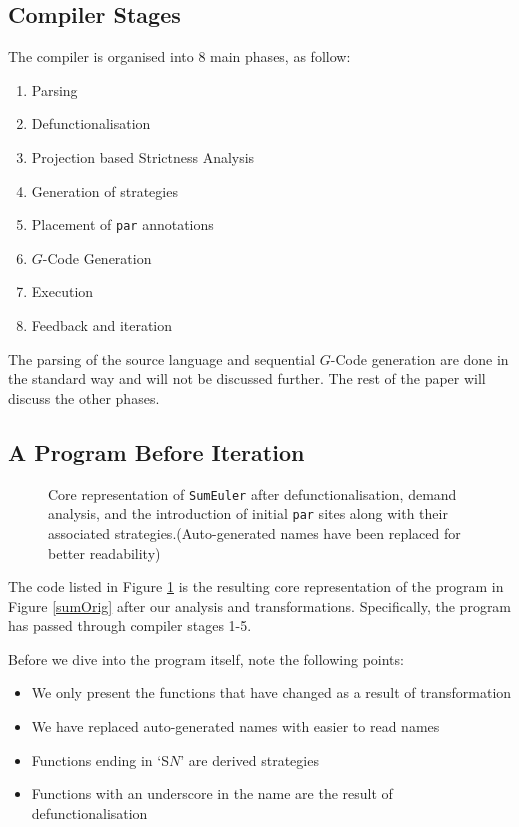 \subsection{Compiler Stages}
The compiler is organised into 8 main phases, as follow:

\begin{enumerate}
    \item Parsing
    \item Defunctionalisation
    \item Projection based Strictness Analysis
    \item Generation of strategies
    \item Placement of \verb-par- annotations
    \item $G$-Code Generation
    \item Execution
    \item Feedback and iteration
\end{enumerate}

The parsing of the source language and sequential $G$-Code generation are done
in the standard way and will not be discussed further. The rest of the paper will
discuss the other phases.

\subsection{A Program Before Iteration}

\begin{figure}[t!]
  
\caption{Core representation of \texttt{SumEuler} after defunctionalisation, demand
         analysis, and the introduction of initial \texttt{par} sites along
         with their associated strategies.(Auto-generated names have been
         replaced for better readability)}
\label{sumLast}
\end{figure}

The code listed in Figure \ref{sumLast} is the resulting core representation
of the program in Figure \ref{sumOrig} after our analysis and transformations.
Specifically, the program has passed through compiler stages 1-5.

Before we dive into the program itself, note the following points:

\begin{itemize}
    \item We only present the functions that have changed as a result of transformation
    \item We have replaced auto-generated names with easier to read names
    \item Functions ending in `S$N$' are derived strategies
    \item Functions with an underscore in the name are the result of defunctionalisation
\end{itemize}

